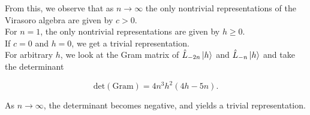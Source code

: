 \noindent From this, we observe that as $n \rightarrow \infty$ the only nontrivial representations of the Virasoro algebra are given by $c>0$. \\

\noindent For $n=1$, the only nontrivial representations are given by $h \ge 0$. \\

\noindent If $c=0$ and $h=0$, we get a trivial representation. \\

\noindent For arbitrary $h$, we look at the Gram matrix of $\hat{L}_{-2n} \ket{h}$ and $\hat{L}_{-n} \ket{h}$ and take the determinant

\begin{equation}
\text{det}(\text{Gram}) = 4n^3 h^2 (4h - 5n).
\end{equation}

\noindent As $n \rightarrow \infty$, the determinant becomes negative, and yields a trivial representation.